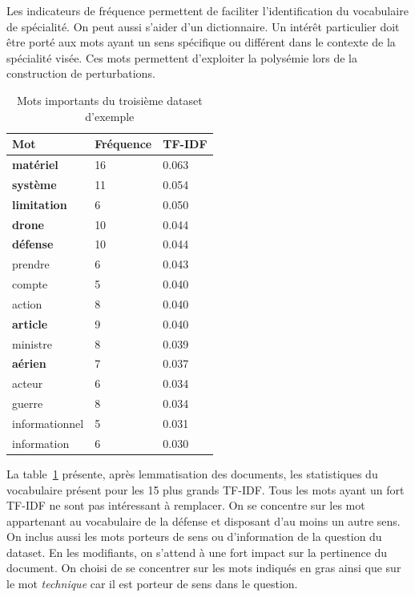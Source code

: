         
        Les indicateurs de fréquence permettent de faciliter l'identification du vocabulaire de spécialité. On peut aussi s'aider d'un dictionnaire. Un intérêt particulier doit être porté aux mots ayant un sens spécifique ou différent dans le contexte de la spécialité visée. Ces mots permettent d'exploiter la polysémie lors de la construction de perturbations.

        \begin{table}[!ht]
            \centering
            \begin{tabular}{|l|l|l|}
            \hline
                Mot & Fréquence & TF-IDF \\ \hline \hline
                \textbf{matériel} & 16 & 0.063 \\ \hline
                \textbf{système} & 11 & 0.054 \\ \hline
                \textbf{limitation} & 6 & 0.050 \\ \hline
                \textbf{drone} & 10 & 0.044 \\ \hline
                \textbf{défense} & 10 & 0.044 \\ \hline
                prendre & 6 & 0.043 \\ \hline
                compte & 5 & 0.040 \\ \hline
                action & 8 & 0.040 \\ \hline
                \textbf{article} & 9 & 0.040 \\ \hline
                ministre & 8 & 0.039 \\ \hline
                \textbf{aérien} & 7 & 0.037 \\ \hline
                acteur & 6 & 0.034 \\ \hline
                guerre & 8 & 0.034 \\ \hline
                informationnel & 5 & 0.031 \\ \hline
                information & 6 & 0.030 \\ \hline
            \end{tabular}
            \caption{Mots importants du troisième dataset d'exemple}
            \label{tab:StatsDatasetV3}
        \end{table}

        La table~\ref{tab:StatsDatasetV3} présente, après lemmatisation des documents, les statistiques du vocabulaire présent pour les 15 plus grands TF-IDF. Tous les mots ayant un fort TF-IDF ne sont pas intéressant à remplacer. On se concentre sur les mot appartenant au vocabulaire de la défense et disposant d'au moins un autre sens. On inclus aussi les mots porteurs de sens ou d'information de la question du dataset. En les modifiants, on s'attend à une fort impact sur la pertinence du document. On choisi de se concentrer sur les mots indiqués en gras ainsi que sur le mot \textit{technique} car il est porteur de sens dans le question.


